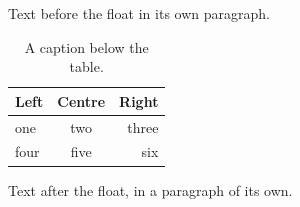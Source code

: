 \documentclass[12pt]{article}
\begin{document}
Text before the float in its own paragraph.

\begin{table}[h]
  \centering
  \begin{tabular}{lcr}\hline Left & Centre & Right\\\hline one & two & three\\ four & five & six\\\hline\end{tabular}
  \caption{A caption below the table.}
\end{table}

Text after the float, in a paragraph of its own.
\end{document}
